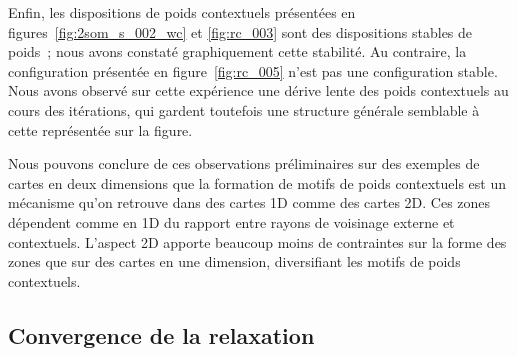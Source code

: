 \documentclass[../main]{subfiles}
\begin{document}
Enfin, les dispositions de poids contextuels présentées en figures~\ref{fig:2som_s_002_wc} et \ref{fig:rc_003} sont des dispositions stables de poids~; nous avons constaté graphiquement cette stabilité. Au contraire, la configuration présentée en figure~\ref{fig:rc_005} n'est pas une configuration stable. Nous avons observé sur cette expérience une dérive lente des poids contextuels au cours des itérations, qui gardent toutefois une structure générale semblable à cette représentée sur la figure.

Nous pouvons conclure de ces observations préliminaires sur des exemples de cartes en deux dimensions que la formation de motifs de poids contextuels est un mécanisme qu'on retrouve dans des cartes 1D comme des cartes 2D. 
Ces zones dépendent comme en 1D du rapport entre rayons de voisinage externe et contextuels.
L'aspect 2D apporte beaucoup moins de contraintes sur la forme des zones que sur des cartes en une dimension, diversifiant les motifs de poids contextuels.


\subsection{Convergence de la relaxation \label{par:conv2D}}
\end{document}
